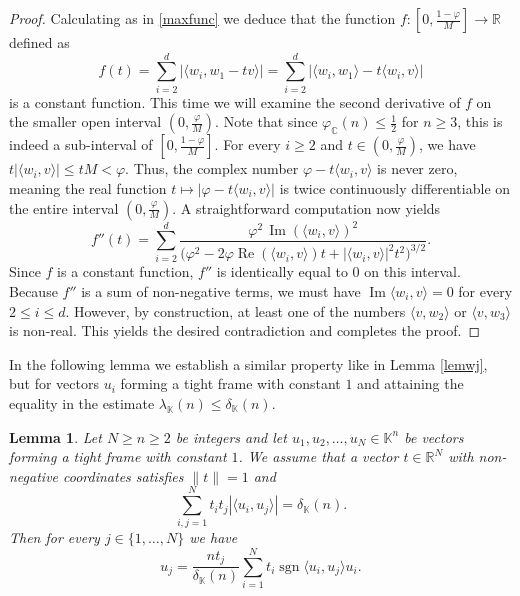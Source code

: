 \documentclass[12pt, reqno]{amsart}
\newtheorem{lem}[twr]{Lemma}
\theoremstyle{definition}
\theoremstyle{remark}
\numberwithin{equation}{section}
\DeclareMathOperator{\sgn}{sgn}
\DeclareMathOperator{\re}{Re}
\DeclareMathOperator{\im}{Im}
\begin{document}
\begin{proof}
Calculating as in \eqref{maxfunc} we deduce that the function  $f: \left [0, \frac{1-\varphi}{M} \right ] \to \mathbb{R}$ defined as
$$f(t) = \sum_{i=2}^{d} |\langle w_i, w_1 - tv \rangle | = \sum_{i=2}^{d}|\langle w_i, w_1 \rangle - t \langle w_i, v \rangle |$$
is a constant function. This time we will examine the second derivative of $f$ on the smaller open interval $\left(0, \frac{\varphi}{M}\right)$. Note that since $\varphi_{\mathbb{C}}(n) \leq \frac{1}{2}$ for $n \ge 3$, this is indeed a sub-interval of $\left[0, \frac{1-\varphi}{M}\right]$. For every $i\ge2$ and $t \in \left(0, \frac{\varphi}{M}\right)$, we have $t|\langle w_i, v \rangle| \le tM < \varphi$. Thus, the complex number $\varphi - t\langle w_i, v \rangle$ is never zero, meaning the real function $t\mapsto |\varphi-t\langle w_i,v\rangle|$ is twice continuously differentiable on the entire interval $\left(0, \frac{\varphi}{M}\right)$. A straightforward computation now yields
$$ f''(t) = \sum_{i=2}^{d} \frac{\varphi^2\,\im(\langle w_i,v\rangle)^2} {\bigl(\varphi^2 -2\varphi\re(\langle w_i,v\rangle)t +|\langle w_i,v\rangle|^2t^2 \bigr)^{3/2}}.$$
Since $f$ is a constant function, $f''$ is identically equal to $0$ on this interval. Because $f''$ is a sum of non-negative terms, we must have $\im\langle w_i,v\rangle=0$ for every $2 \leq i \leq d$. However, by construction, at least one of the numbers $\langle v, w_2 \rangle$ or $\langle v, w_3 \rangle$ is non-real. This yields the desired contradiction and completes the proof.


\end{proof}

In the following lemma we establish a similar property like in Lemma \ref{lemwj}, but for vectors $u_i$ forming a tight frame with constant $1$ and attaining the equality in the estimate $\lambda_{\mathbb{K}}(n) \leq \delta_{\mathbb{K}}(n)$. 

\begin{lem}
\label{lemtiui}
Let $N \geq n \geq 2$ be integers and let $u_1, u_2, \ldots, u_N \in \mathbb{K}^n$ be vectors forming a tight frame with constant $1$. We assume that a vector $t \in \mathbb{R}^N$ with non-negative coordinates satisfies $\|t\|=1$ and
$$\sum_{i, j=1}^{N} t_it_j |\langle u_i, u_j \rangle| = \delta_{\mathbb{K}}(n).$$
Then for every $j \in \{1, \ldots, N\}$ we have
$$u_j =\frac{nt_j}{\delta_{\mathbb{K}}(n)} \sum_{i=1}^{N} t_i \sgn \langle u_i, u_j \rangle u_i.$$
\end{lem}
\end{document}
